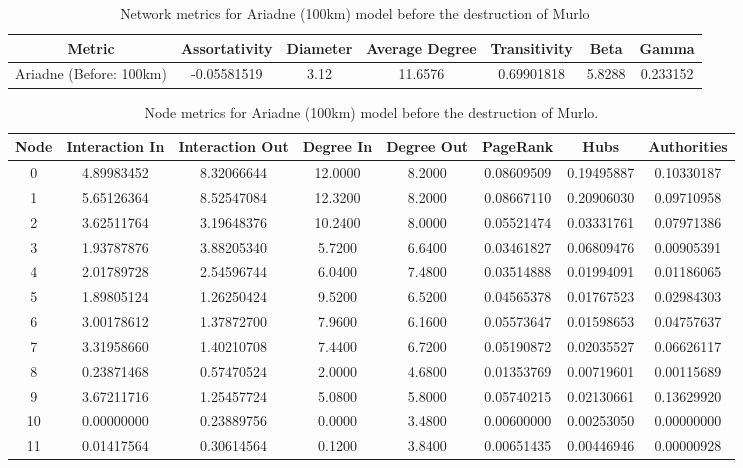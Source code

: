 \documentclass[12pt,a4paper]{thesis}
\begin{document}
\begin{table}[H]
\centering
\caption{Network metrics for Ariadne (100km) model before the destruction of Murlo}
\tiny
\begin{tabular}{|c|c|c|c|c|c|c|}
\hline Metric & Assortativity & Diameter & Average Degree & Transitivity & Beta & Gamma \\ 
\hline Ariadne (Before: 100km) & -0.05581519 & 3.12 & 11.6576	& 0.69901818 & 5.8288 & 0.233152 \\
\hline 
\end{tabular} 
\label{tab:ariadneNetBefore100}
\end{table}


\begin{table}[H]
\centering
\caption{Node metrics for Ariadne (100km) model before the destruction of Murlo.}
\tiny
\begin{tabular}{|c|c|c|c|c|c|c|c|}
\hline	Node	&	Interaction In	&	Interaction Out	&	Degree In	&	Degree Out	&	PageRank	&	Hubs	&	Authorities	\\
\hline	0	&	4.89983452	&	8.32066644	&	12.0000	&	8.2000	&	0.08609509	&	0.19495887	&	0.10330187	\\
\hline	1	&	5.65126364	&	8.52547084	&	12.3200	&	8.2000	&	0.08667110	&	0.20906030	&	0.09710958	\\
\hline	2	&	3.62511764	&	3.19648376	&	10.2400	&	8.0000	&	0.05521474	&	0.03331761	&	0.07971386	\\
\hline	3	&	1.93787876	&	3.88205340	&	5.7200	&	6.6400	&	0.03461827	&	0.06809476	&	0.00905391	\\
\hline	4	&	2.01789728	&	2.54596744	&	6.0400	&	7.4800	&	0.03514888	&	0.01994091	&	0.01186065	\\
\hline	5	&	1.89805124	&	1.26250424	&	9.5200	&	6.5200	&	0.04565378	&	0.01767523	&	0.02984303	\\
\hline	6	&	3.00178612	&	1.37872700	&	7.9600	&	6.1600	&	0.05573647	&	0.01598653	&	0.04757637	\\
\hline	7	&	3.31958660	&	1.40210708	&	7.4400	&	6.7200	&	0.05190872	&	0.02035527	&	0.06626117	\\
\hline	8	&	0.23871468	&	0.57470524	&	2.0000	&	4.6800	&	0.01353769	&	0.00719601	&	0.00115689	\\
\hline	9	&	3.67211716	&	1.25457724	&	5.0800	&	5.8000	&	0.05740215	&	0.02130661	&	0.13629920	\\
\hline	10	&	0.00000000	&	0.23889756	&	0.0000	&	3.4800	&	0.00600000	&	0.00253050	&	0.00000000	\\
\hline	11	&	0.01417564	&	0.30614564	&	0.1200	&	3.8400	&	0.00651435	&	0.00446946	&	0.00000928	\\

\end{tabular}
\end{table}
\end{document}
